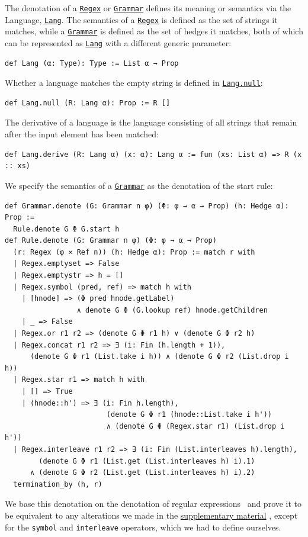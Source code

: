 \documentclass[runningheads]{llncs}
\newcommand{\link}[2]{\mbox{\hyperref[#2]{\lstinline{#1}}}\xspace}
\newcommand{\Grammar}{\link{Grammar}{Grammar}}
\newcommand{\Regex}{\link{Regex}{Regex}}
\newcommand{\Lang}{\link{Lang}{def Lang}}
\newcommand{\LangNull}{\link{Lang.null}{def Lang.null}}
\newcommand{\supplementarymaterial}{%
  \hyperref[supplementary_material]{supplementary material}\xspace%
}
\begin{document}
The denotation of a \Regex or \Grammar defines its meaning or semantics via the Language, \Lang.
The semantics of a \Regex is defined as the set of strings it matches, while a \Grammar is defined as the set of hedges it matches, both of which can be represented as \Lang with a different generic parameter:
\begin{lstlisting}[label=def Lang]
def Lang (α: Type): Type := List α → Prop
\end{lstlisting}
Whether a language matches the empty string is defined in \LangNull:
\begin{lstlisting}[label=def Lang.null]
def Lang.null (R: Lang α): Prop := R []
\end{lstlisting}
The derivative of a language is the language consisting of all strings that remain after the input element has been matched:
\begin{lstlisting}[label=def Lang.derive]
def Lang.derive (R: Lang α) (x: α): Lang α := fun (xs: List α) => R (x :: xs)
\end{lstlisting}
We specify the semantics of a \Grammar as the denotation of the start rule:
\begin{lstlisting}[label=def Rule.denote]
def Grammar.denote (G: Grammar n φ) (Φ: φ → α → Prop) (h: Hedge α): Prop :=
  Rule.denote G Φ G.start h
def Rule.denote (G: Grammar n φ) (Φ: φ → α → Prop)
  (r: Regex (φ × Ref n)) (h: Hedge α): Prop := match r with
  | Regex.emptyset => False
  | Regex.emptystr => h = []
  | Regex.symbol (pred, ref) => match h with
    | [hnode] => (Φ pred hnode.getLabel)
                 ∧ denote G Φ (G.lookup ref) hnode.getChildren
    | _ => False
  | Regex.or r1 r2 => (denote G Φ r1 h) ∨ (denote G Φ r2 h)
  | Regex.concat r1 r2 => ∃ (i: Fin (h.length + 1)),
      (denote G Φ r1 (List.take i h)) ∧ (denote G Φ r2 (List.drop i h))
  | Regex.star r1 => match h with
    | [] => True
    | (hnode::h') => ∃ (i: Fin h.length),
                        (denote G Φ r1 (hnode::List.take i h'))
                        ∧ (denote G Φ (Regex.star r1) (List.drop i h'))
  | Regex.interleave r1 r2 => ∃ (i: Fin (List.interleaves h).length),
        (denote G Φ r1 (List.get (List.interleaves h) i).1)
      ∧ (denote G Φ r2 (List.get (List.interleaves h) i).2)
  termination_by (h, r)
\end{lstlisting}
We base this denotation on the denotation of regular expressions~\cite{elliott2021symbolic} and prove it to be equivalent to any alterations we made in the \supplementarymaterial, except for the \lstinline{symbol} and \lstinline{interleave} operators, which we had to define ourselves.
\end{document}
